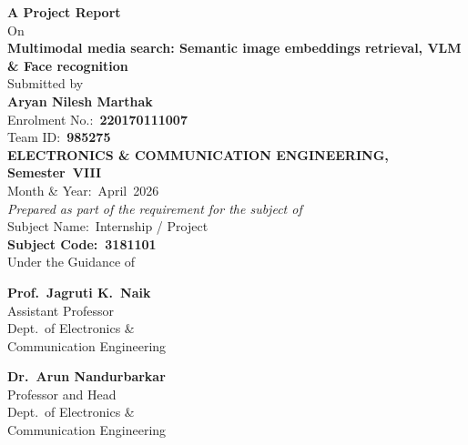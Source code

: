\documentclass[12pt,a4paper,oneside]{report}
\begin{document}

\begin{titlepage}
\thispagestyle{empty}
\hypersetup{pageanchor=false}

\begin{center}
\begin{singlespace}

\vspace*{0.8cm}
{\Large\textbf{A Project Report}}\\[12pt]
On\\[12pt]
{\Large\textbf{Multimodal media search:
Semantic image embeddings retrieval,
VLM \& Face recognition}}\\[32pt]

Submitted by\\[8pt]
\textbf{Aryan Nilesh Marthak}\\
Enrolment No.:\ \textbf{220170111007}\\
Team ID:\ \textbf{985275}\\
\textbf{ELECTRONICS \& COMMUNICATION ENGINEERING, Semester~VIII}\\
Month \& Year:\ April~2026\\[22pt]

\textit{Prepared as part of the requirement for the subject of}\\[6pt]
Subject Name:\ Internship / Project\\
\textbf{Subject Code:\ 3181101}\\[26pt]

Under the Guidance of\\[14pt]
\noindent
\begin{minipage}[t]{0.45\textwidth}
  \centering
  \textbf{Prof.\ Jagruti K.\ Naik}\\
  Assistant Professor\\
  Dept.\ of Electronics \&\\
  Communication Engineering
\end{minipage}
\hfill
\begin{minipage}[t]{0.45\textwidth}
  \centering
  \textbf{Dr.\ Arun Nandurbarkar}\\
  Professor and Head\\
  Dept.\ of Electronics \&\\
  Communication Engineering
\end{minipage}


\end{singlespace}
\end{center}
\end{titlepage}
\end{document}
